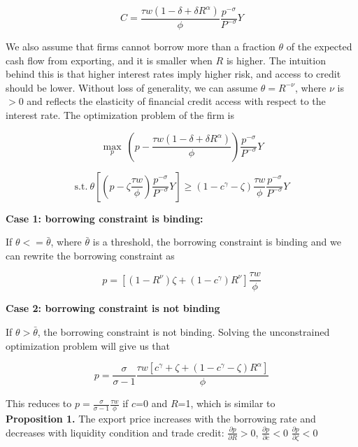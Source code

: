 \begin{equation}
C=\frac{\tau w(1-\delta+\delta R^\alpha)}{\phi} \frac{p^{-\sigma}}{P^{-\sigma}} Y
\end{equation}

We also assume that firms cannot borrow more than a fraction $\theta$ of the expected cash flow from exporting, and it is smaller when $R$ is higher. The intuition behind this is that higher interest rates imply higher risk, and access to credit should be lower. Without loss of generality, we can assume $\theta=R^{-\nu}$, where $\nu$ is $>0$ and reflects the elasticity of financial credit access with respect to the interest rate. The optimization problem of the firm is 

$$
\max_{p} \ (p- \frac{\tau w(1-\delta+\delta R^\alpha)}{\phi}) \frac{p^{-\sigma}}{P^{-\sigma}} Y
$$

\begin{equation}
\text{s.t.} \ \theta [(p-\zeta \frac{\tau w}{\phi}) \frac{p^{-\sigma}}{P^{-\sigma}} Y]\geq(1-c^\gamma-\zeta)\frac{\tau w}{\phi} \frac{p^{-\sigma}}{P^{-\sigma}} Y
\end{equation}


\textbf{Case 1: borrowing constraint is binding: }

If $\theta<=\bar{\theta}$, where $\bar{\theta}$ is a threshold, the borrowing constraint is binding and we can rewrite the borrowing constraint as 

\begin{equation}
p=[(1-R^{\nu})\zeta+(1-c^\gamma)R^{\nu}] \frac{\tau w}{\phi}
\end{equation}

\textbf{Case 2: borrowing constraint is not binding}

If $\theta>\bar{\theta}$, the borrowing constraint is not binding. Solving the unconstrained optimization problem will give us that

\begin{equation}
p=\frac{\sigma}{\sigma-1}\frac{\tau w [c^\gamma+\zeta+(1-c^\gamma-\zeta) R^\alpha]}{\phi}
\end{equation}

This reduces to $p=\frac{\sigma}{\sigma-1}\frac{\tau w}{\phi}$ if $c$=0 and $R$=1, which is similar to \cite{melitz2003impact} \\


\textbf{Proposition 1.} The export price increases with the borrowing rate and decreases with liquidity condition and trade credit: $\frac{\partial p}{\partial R}>0$, $\frac{\partial p}{\partial c}<0$ $\frac{\partial p}{\partial \zeta}<0$

